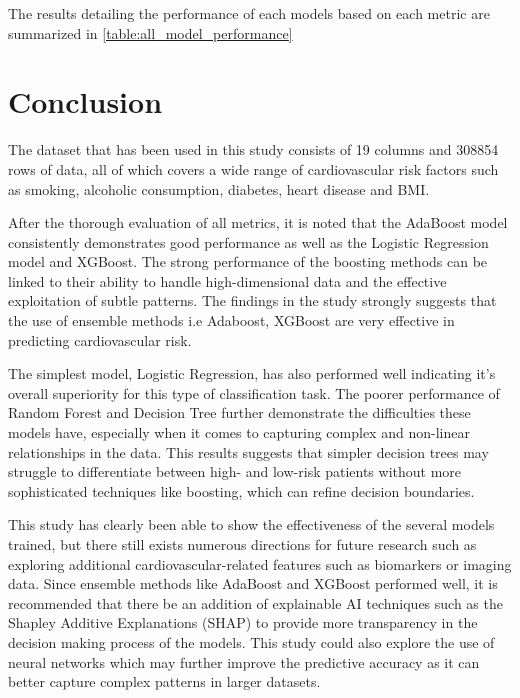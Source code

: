 \documentclass[12pt, a4paper,twoside]{report}
\numberwithin{equation}{chapter}
\begin{document}
The results detailing the performance of each models based on each metric are summarized in \ref{table:all_model_performance}


\chapter{Conclusion}\label{ch:concl}

The dataset that has been used in this study consists of 19 columns and 308854 rows of data, all of which covers a wide range of cardiovascular risk factors such as smoking, alcoholic consumption, diabetes, heart disease and BMI.

After the thorough evaluation of all metrics, it is noted that the AdaBoost model consistently demonstrates good performance as well as the Logistic Regression model and XGBoost. The strong performance of the boosting methods can be linked to their ability to handle high-dimensional data and the effective exploitation of subtle patterns. The findings in the study strongly suggests that the use of ensemble methods i.e Adaboost, XGBoost are very effective in predicting cardiovascular risk. 

The simplest model, Logistic Regression, has also performed well indicating it's overall superiority for this type of classification task. The poorer performance of Random Forest and Decision Tree further demonstrate the difficulties these models have, especially when it comes to capturing complex and non-linear relationships in the data. This results suggests that simpler decision trees may struggle to differentiate between high- and low-risk patients without more sophisticated techniques like boosting, which can refine decision boundaries.

This study has clearly been able to show the effectiveness of the several models trained, but there still exists numerous directions for future research such as exploring additional cardiovascular-related features such as biomarkers or imaging data. Since ensemble methods like AdaBoost and XGBoost performed well, it is recommended that there be an addition of explainable AI techniques such as the Shapley Additive Explanations (SHAP) to provide more transparency in the decision making process of the models. This study could also explore the use of neural networks which may further improve the predictive accuracy as it can better capture complex patterns in larger datasets.


\printbibliography
\end{document}
